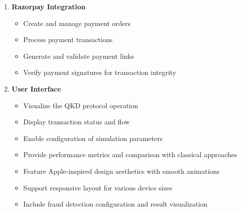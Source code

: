\documentclass[onecolumn,a4paper,10pt]{IEEEtran}
\begin{document}
\begin{enumerate}
    \item \textbf{Razorpay Integration}
    \begin{itemize}
        \item Create and manage payment orders
        \item Process payment transactions
        \item Generate and validate payment links
        \item Verify payment signatures for transaction integrity
    \end{itemize}
    
    \item \textbf{User Interface}
    \begin{itemize}
        \item Visualize the QKD protocol operation
        \item Display transaction status and flow
        \item Enable configuration of simulation parameters
        \item Provide performance metrics and comparison with classical approaches
        \item Feature Apple-inspired design aesthetics with smooth animations
        \item Support responsive layout for various device sizes
        \item Include fraud detection configuration and result visualization
    \end{itemize}
\end{enumerate}
\end{document}
